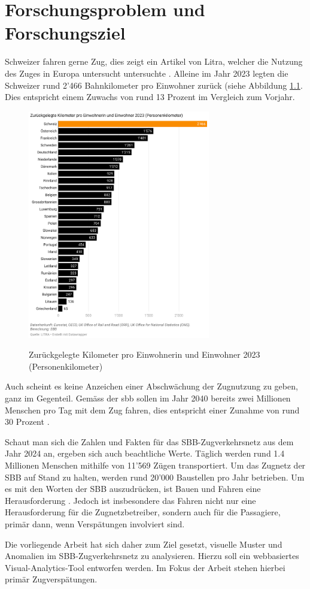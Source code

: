 \chapter{Forschungsproblem und Forschungsziel}
\label{kap:forschungsproblem_forschungsziel}
Schweizer fahren gerne Zug, dies zeigt ein Artikel von Litra, welcher die Nutzung des Zuges in Europa untersucht untersuchte \parencite{litra_bahnfahrtstatistik_europa_2023}. Alleine im Jahr 2023 legten die Schweizer rund 2'466 Bahnkilometer pro Einwohner zurück (siehe Abbildung \ref{fig_schweizer_fahren_zug}. Dies entspricht einem Zuwachs von rund 13 Prozent im Vergleich zum Vorjahr. 

\begin{figure}[H]
    \caption{Zurückgelegte Kilometer pro Einwohnerin und Einwohner 2023 (Personenkilometer) \parencite{litra_bahnfahrtstatistik_europa_2023}}
    \includegraphics[height=10cm]{content/00_assets/schweizer_fahren_zug.png}
    \label{fig_schweizer_fahren_zug}
\end{figure}

Auch scheint es keine Anzeichen einer Abschwächung der Zugnutzung zu geben, ganz im Gegenteil. Gemäss der \acrfull{sbb} sollen im Jahr 2040 bereits zwei Millionen Menschen pro Tag mit dem Zug fahren, dies entspricht einer Zunahme von rund 30 Prozent \parencite{sbb_ausbauschritt_2025}.

Schaut man sich die Zahlen und Fakten für das SBB-Zugverkehrsnetz aus dem Jahr 2024 an, ergeben sich auch beachtliche Werte. Täglich werden rund 1.4 Millionen Menschen mithilfe von 11'569 Zügen transportiert. Um das Zugnetz der SBB auf Stand zu halten, werden rund 20'000 Baustellen pro Jahr betrieben. Um es mit den Worten der SBB auszudrücken, ist Bauen und Fahren eine Herausforderung \parencite[S.8 - 9]{sbb_geschäftsbericht_2024}. Jedoch ist insbesondere das Fahren nicht nur eine Herausforderung für die Zugnetzbetreiber, sondern auch für die Passagiere, primär dann, wenn Verspätungen involviert sind.

Die vorliegende Arbeit hat sich daher zum Ziel gesetzt, visuelle Muster und Anomalien im SBB-Zugverkehrsnetz zu analysieren. Hierzu soll ein webbasiertes Visual-Analytics-Tool entworfen werden. Im Fokus der Arbeit stehen hierbei primär Zugverspätungen.

